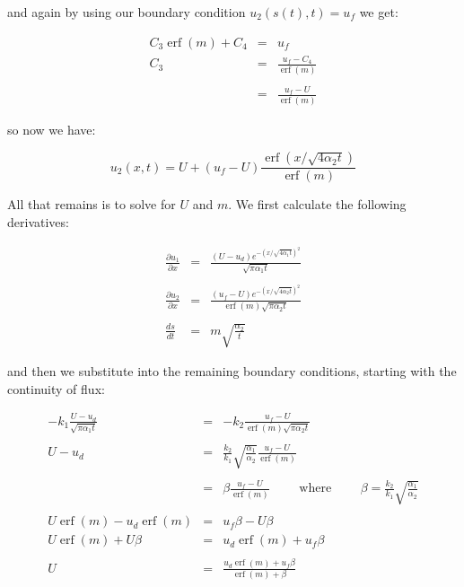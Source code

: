 \documentclass{report}
\DeclareMathOperator{\erf}{erf}
\begin{document}
and again by using our boundary condition $u_2(s(t), t) = u_f$ we get:\bigskip

\begin{eqnarray*}
  C_3 \erf (m) + C_4 & = & u_f \\
                 C_3 & = & \frac{u_f - C_4}{\erf (m)} \\\\
                     & = & \frac{u_f - U}{\erf (m)} 
\end{eqnarray*}\medskip

so now we have:\bigskip

\[ u_2(x, t) = U + (u_f - U) \frac{\erf ( x / \sqrt{4 \alpha_2 t} )}{\erf (m)}  \]\medskip



All that remains is to solve for $U$ and $m$. We first calculate the following derivatives:\bigskip

\begin{eqnarray*}
  \frac{\partial u_1}{\partial x} & = & \frac{(U - u_d) e^{-(x / \sqrt{4 \alpha_1 t})^2}}{\sqrt{\pi \alpha_1 t}} \\\\
  \frac{\partial u_2}{\partial x} & = & \frac{(u_f - U) e^{-(x / \sqrt{4 \alpha_2 t})^2}}{\erf (m) \sqrt{\pi \alpha_2 t}} \\\\
                  \frac{d s}{d t} & = & m \sqrt{\frac{\alpha_2}{t}}
\end{eqnarray*}\medskip

and then we substitute into the remaining boundary conditions, starting with the continuity of flux:\bigskip

\begin{eqnarray*}
  -k_1 \frac{U - u_d}{\sqrt{\pi \alpha_1 t}} & = & -k_2 \frac{u_f - U}{\erf (m) \sqrt{\pi \alpha_2 t}} \\\\
                                     U - u_d & = & \frac{k_2}{k_1} \sqrt{\frac{\alpha_1}{\alpha_2}} \frac{u_f - U}{\erf (m)} \\\\
                                             & = & \beta \frac{u_f - U}{\erf (m)} \qquad \text{ where } \qquad \beta = \frac{k_2}{k_1} \sqrt{\frac{\alpha_1}{\alpha_2}} \\\\
                   U \erf (m) - u_d \erf (m) & = & u_f \beta - U \beta \\
                        U \erf (m) + U \beta & = & u_d \erf (m) + u_f \beta \\\\
                                           U & = & \frac{u_d \erf (m) + u_f \beta}{\erf (m) + \beta}
\end{eqnarray*}\medskip
\end{document}
